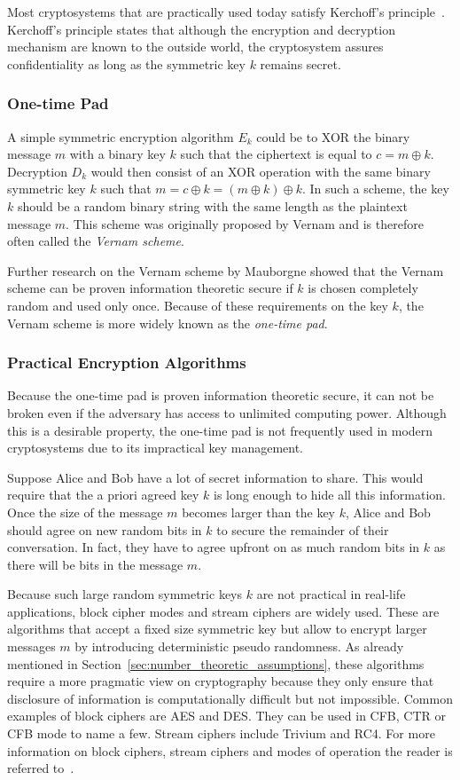Most cryptosystems that are practically used today satisfy Kerchoff's principle~\cite{art:Kerckhoffs1883}. Kerchoff's principle states that although the encryption and decryption mechanism are known to the outside world, the cryptosystem assures confidentiality as long as the symmetric key $k$ remains secret.

\subsubsection{One-time Pad}
A simple symmetric encryption algorithm $E_k$ could be to XOR the binary message $m$ with a binary key $k$ such that the ciphertext is equal to $c = m \oplus k$. Decryption $D_k$ would then consist of an XOR operation with the same binary symmetric key $k$ such that $m = c \oplus k = \left( m \oplus k \right) \oplus k$.  In such a scheme, the key $k$ should be a random binary string with the same length as the plaintext message $m$. This scheme was originally proposed by Vernam and is therefore often called the \textit{Vernam scheme}.

Further research on the Vernam scheme by Mauborgne showed that the Vernam scheme can be proven information theoretic secure if $k$ is chosen completely random and used only once. Because of these requirements on the key $k$, the Vernam scheme is more widely known as the \textit{one-time pad}.

\subsubsection{Practical Encryption Algorithms}
Because the one-time pad is proven information theoretic secure, it can not be broken even if the adversary has access to unlimited computing power. Although this is a desirable property, the one-time pad is not frequently used in modern cryptosystems due to its impractical key management.

Suppose Alice and Bob have a lot of secret information to share. This would require that the a priori agreed key $k$ is long enough to hide all this information. Once the size of the message $m$ becomes larger than the key $k$, Alice and Bob should agree on new random bits in $k$ to secure the remainder of their conversation. In fact, they have to agree upfront on as much random bits in $k$ as there will be bits in the message $m$.

Because such large random symmetric keys $k$ are not practical in real-life applications, block cipher modes and stream ciphers are widely used. These are algorithms that accept a fixed size symmetric key but allow to encrypt larger messages $m$ by introducing deterministic pseudo randomness. As already mentioned in Section~\ref{sec:number_theoretic_assumptions}, these algorithms require a more pragmatic view on cryptography because they only ensure that disclosure of information is computationally difficult but not impossible. Common examples of block ciphers are AES and DES. They can be used in CFB, CTR or CFB mode to name a few. Stream ciphers include Trivium and RC4. For more information on block ciphers, stream ciphers and modes of operation the reader is referred to~\cite{book:handbook_of_applied_cryptography}.


